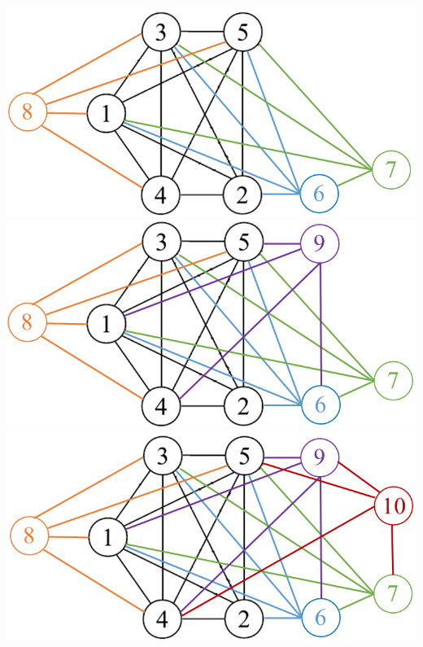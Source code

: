 \documentclass{beamer}
\begin{document}
\begin{frame}
\begin{columns}[t]
	\centering \\
\end{columns}
\vspace{.5cm}
\begin{columns}[t]	
    \includegraphics[scale=0.25]{figures/RobustDigraph3.png}
	\centering \\  
    \includegraphics[scale=0.25]{figures/RobustDigraph4.png}
	\centering \\	
    \includegraphics[scale=0.25]{figures/RobustDigraph5.png}
	\centering \\
\end{columns}

\end{frame}
\end{document}
